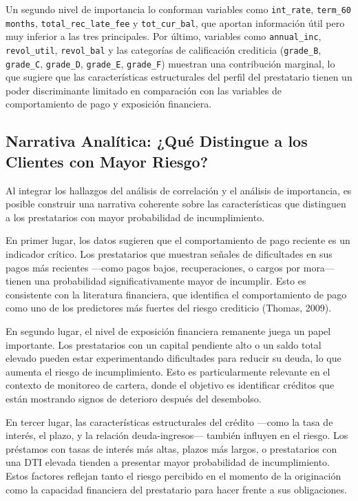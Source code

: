 \documentclass[12pt,a4paper]{article}
\begin{document}
Un segundo nivel de importancia lo conforman variables como \texttt{int\_rate}, \texttt{term\_60 months}, \texttt{total\_rec\_late\_fee} y \texttt{tot\_cur\_bal}, que aportan información útil pero muy inferior a las tres principales. Por último, variables como \texttt{annual\_inc}, \texttt{revol\_util}, \texttt{revol\_bal} y las categorías de calificación crediticia (\texttt{grade\_B}, \texttt{grade\_C}, \texttt{grade\_D}, \texttt{grade\_E}, \texttt{grade\_F}) muestran una contribución marginal, lo que sugiere que las características estructurales del perfil del prestatario tienen un poder discriminante limitado en comparación con las variables de comportamiento de pago y exposición financiera.

\subsection{Narrativa Analítica: ¿Qué Distingue a los Clientes con Mayor Riesgo?}

Al integrar los hallazgos del análisis de correlación y el análisis de importancia, es posible construir una narrativa coherente sobre las características que distinguen a los prestatarios con mayor probabilidad de incumplimiento.

En primer lugar, los datos sugieren que el comportamiento de pago reciente es un indicador crítico. Los prestatarios que muestran señales de dificultades en sus pagos más recientes ---como pagos bajos, recuperaciones, o cargos por mora--- tienen una probabilidad significativamente mayor de incumplir. Esto es consistente con la literatura financiera, que identifica el comportamiento de pago como uno de los predictores más fuertes del riesgo crediticio (Thomas, 2009).

En segundo lugar, el nivel de exposición financiera remanente juega un papel importante. Los prestatarios con un capital pendiente alto o un saldo total elevado pueden estar experimentando dificultades para reducir su deuda, lo que aumenta el riesgo de incumplimiento. Esto es particularmente relevante en el contexto de monitoreo de cartera, donde el objetivo es identificar créditos que están mostrando signos de deterioro después del desembolso.

En tercer lugar, las características estructurales del crédito ---como la tasa de interés, el plazo, y la relación deuda-ingresos--- también influyen en el riesgo. Los préstamos con tasas de interés más altas, plazos más largos, o prestatarios con una DTI elevada tienden a presentar mayor probabilidad de incumplimiento. Estos factores reflejan tanto el riesgo percibido en el momento de la originación como la capacidad financiera del prestatario para hacer frente a sus obligaciones.
\end{document}
